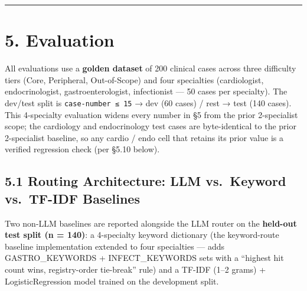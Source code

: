 \documentclass[
  american,
  a4paper,
]{article}
\begin{document}
\begin{center}\rule{0.5\linewidth}{0.5pt}\end{center}

\section{5. Evaluation}\label{evaluation}

All evaluations use a \textbf{golden dataset} of 200 clinical cases
across three difficulty tiers (Core, Peripheral, Out-of-Scope) and four
specialties (cardiologist, endocrinologist, gastroenterologist,
infectionist --- 50 cases per specialty). The dev/test split is
\texttt{case-number\ ≤\ 15} → dev (60 cases) / rest → test (140 cases).
This 4-specialty evaluation widens every number in §5 from the prior
2-specialist scope; the cardiology and endocrinology test cases are
byte-identical to the prior 2-specialist baseline, so any cardio / endo
cell that retains its prior value is a verified regression check (per
§5.10 below).

\subsection{5.1 Routing Architecture: LLM vs.~Keyword vs.~TF-IDF
Baselines}\label{routing-architecture-llm-vs.-keyword-vs.-tf-idf-baselines}

Two non-LLM baselines are reported alongside the LLM router on the
\textbf{held-out test split (n = 140)}: a 4-specialty keyword dictionary
(the keyword-route baseline implementation extended to four specialties
--- adds GASTRO\_KEYWORDS + INFECT\_KEYWORDS sets with a ``highest hit
count wins, registry-order tie-break'' rule) and a TF-IDF (1--2 grams) +
LogisticRegression model trained on the development split.
\end{document}
